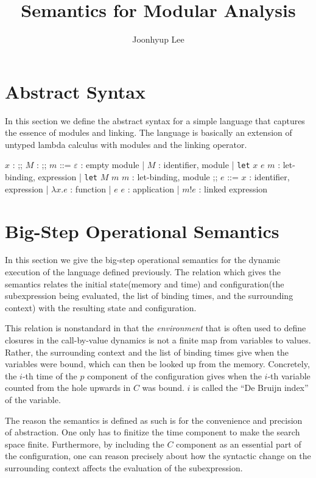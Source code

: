 \documentclass{article}
\title{Semantics for Modular Analysis}
\author{Joonhyup Lee}
\date{}
\newcommand*{\ExprVar}{\mathit{ExprVar}}
\newcommand*{\ModVar}{\mathit{ModVar}}
\newcommand*{\link}[2]{{#1}\mathtt{!}{#2}}
\begin{document}
\maketitle

\section{Abstract Syntax}

In this section we define the abstract syntax for a simple language that captures the essence of modules and linking.
The language is basically an extension of untyped lambda calculus with modules and the linking operator.

\begin{bnfgrammar}
  $x$ : \in \ExprVar
  ;;
  $M$ : \in \ModVar
  ;;
  $m$ ::= $\varepsilon$ : empty module
  | $M$ : identifier, module
  | \texttt{let} $x$ $e$ $m$ : let-binding, expression
  | \texttt{let} $M$ $m$ $m$ : let-binding, module
  ;;
  $e$ ::= $x$ : identifier, expression
  | $\lambda x.e$ : function
  | $e$ $e$ : application
  | $\link{m}{e}$ : linked expression
\end{bnfgrammar}

\section{Big-Step Operational Semantics}

In this section we give the big-step operational semantics for the dynamic execution of the language defined previously.
The relation which gives the semantics relates the initial state(memory and time) and configuration(the subexpression being evaluated, the list of binding times, and the surrounding context) with the resulting state and configuration.

This relation is nonstandard in that the \textit{environment} that is often used to define closures in the call-by-value dynamics is not a finite map from variables to values.
Rather, the surrounding context and the list of binding times give when the variables were bound, which can then be looked up from the memory.
Concretely, the $i$-th time of the $p$ component of the configuration gives when the $i$-th variable counted from the hole upwards in $C$ was bound.
$i$ is called the ``De Bruijn index'' of the variable.

The reason the semantics is defined as such is for the convenience and precision of abstraction.
One only has to finitize the time component to make the search space finite.
Furthermore, by including the $C$ component as an essential part of the configuration, one can reason precisely about how the syntactic change on the surrounding context affects the evaluation of the subexpression.
\end{document}
